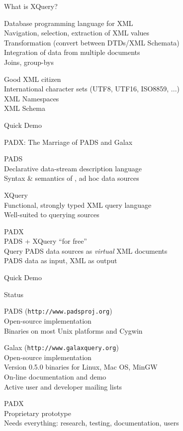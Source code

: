 \documentclass[landscape]{slides}
\begin{document}
\begin{Slide}{What is XQuery?}

  \bb Database programming language for XML \\
  \bbb Navigation, selection, extraction of XML values \\
  \bbb Transformation (convert between DTDs/XML Schemata)\\
  \bbb Integration of data from multiple documents \\
  \bbbb Joins, group-bys

  \bb Good XML citizen\\
  \bbb International character sets (UTF8, UTF16, ISO8859, ...) \\
  \bbb XML Namespaces \\
  \bbb XML Schema 

  \bb Quick Demo 

\end{Slide}

\begin{Slide}{PADX: The Marriage of PADS and Galax}
  
  \vspace*{1cm}
  \bb PADS\\
  \bbb Declarative data-stream description language\\
  \bbb Syntax \& semantics of \emph{}, ad hoc data sources 

  \bb XQuery\\
  \bbb Functional, strongly typed XML query language \\
  \bbb Well-suited to querying \emph{} sources

  \bb PADX\\
  \bbb PADS + XQuery ``for free'' \\
  \bbb Query PADS data sources as \emph{virtual} XML documents \\
  \bbbb PADS data as input, XML as output

  \bb Quick Demo 
\end{Slide}

\begin{Slide}{Status}

  \bb PADS (\texttt{http://www.padsproj.org})\\
  \bbb Open-source implementation \\
  \bbb Binaries on most Unix platforms and Cygwin

  \bb Galax (\texttt{http://www.galaxquery.org})\\
  \bbb Open-source implementation \\
  \bbb Version 0.5.0 binaries for Linux, Mac OS, MinGW\\
  \bbb On-line documentation and demo\\
  \bbb Active user and developer mailing lists 

  \bb PADX\\
  \bbb Proprietary prototype\\
  \bbb Needs everything: research, testing, documentation, users

\end{Slide}
\end{document}
